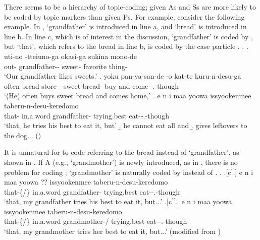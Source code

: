 There seems to be a hierarchy of topic-coding;
given As and Ss are more likely to be coded by topic markers than given Ps.
For example, consider the following example.
In \Next,
 `grandfather' is introduced in line a, and
 `bread' is introduced in line b.
In line c, which is of interest in the discussion,
 `grandfather' is coded by , but
 `that', which refers to the bread in line b, is coded by the case particle .
%
\ex.
 \ag. uti-no -tteiuno-ga okasi-ga sukina mono-de \\
 		out- grandfather-- sweet- favorite thing- \\
		`Our grandfather likes sweets.'
 \bg. yoku pan-ya-san-de -o kat-te kuru-n-desu-ga \\
   often bread-store-- sweet-bread- buy-and come--.-though \\
   `(He) often buys sweet bread and comes home,'
 \bg. e n  i maa yoowa  issyookenmee taberu-n-desu-keredomo \\
     that-   in.a.word grandfather- trying.best eat--.-though \\
   `that, he tries his best to eat it, but'
 \b. he cannot eat all and
 \b. gives leftovers to the dog...
  \hfill{()}

It is unnatural for  to code  referring to the bread
instead of  `grandfather',
as shown in \Next[c$^{\prime}$].
If A (e.g.,  `grandmother') is newly introduced, as in ,
there is no problem for  coding ;
 `grandmother' is naturally coded by  instead of .
%
\ex.
 \ag.[c$^{\prime}$.] e n  i maa yoowa ?? issyookenmee taberu-n-desu-keredomo \\
     that-\{/\}   in.a.word grandfather- trying.best eat--.-though \\
   `that, my grandfather tries his best to eat it, but...'
  \bg.[c$^{\prime\prime}$.] e n  i maa yoowa  issyookenmee taberu-n-desu-keredomo \\
     that-\{/\}   in.a.word grandmother-/ trying.best eat--.-though \\
   `that, my grandmother tries her best to eat it, but...'
   \hfill{(modified from \Last[c])}


